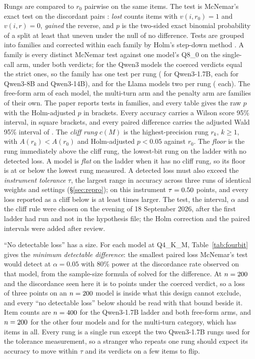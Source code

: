 \documentclass[12pt,letterpaper]{article}
\newcommand{\qm}{Qwen3-1.7B}
\begin{document}
Rungs are compared to $r_0$ pairwise on the same items. The test is McNemar's exact test on the discordant pairs \citep{mcnemar1947}: \emph{lost} counts items with $v(i, r_0)=1$ and $v(i, r)=0$, \emph{gained} the reverse, and $p$ is the two-sided exact binomial probability of a split at least that uneven under the null of no difference. Tests are grouped into families and corrected within each family by Holm's step-down method \citep{holm1979}. A family is every distinct McNemar test against one model's Q8\_0 on the single-call arm, under both verdicts; for the Qwen3 models the coerced verdicts equal the strict ones, so the family has one test per rung (\qtTests{} for \qm{}, \qtTestsEightB{} each for Qwen3-8B and Qwen3-14B), and for the Llama models two per rung (\qtTestsLlamaThreeB{} each). The free-form arm of each model, the multi-turn arm and the penalty arm are families of their own. The paper reports \qtTestsTotal{} tests in \qtFamiliesTotal{} families, and every table gives the raw $p$ with the Holm-adjusted $p$ in brackets. Every accuracy carries a Wilson score 95\% interval, in square brackets, and every paired difference carries the adjusted Wald 95\% interval of \citet{agresti2005paired}. The \emph{cliff rung} $c(M)$ is the highest-precision rung $r_k$, $k \ge 1$, with $A(r_k) < A(r_0)$ and Holm-adjusted $p < 0.05$ against $r_0$. The \emph{floor} is the rung immediately above the cliff rung, the lowest-bit rung on the ladder with no detected loss. A model is \emph{flat} on the ladder when it has no cliff rung, so its floor is at or below the lowest rung measured. A detected loss must also exceed the \emph{instrument tolerance} $\tau$, the largest range in accuracy across three runs of identical weights and settings (\S\ref{sec:repro}); on this instrument $\tau = 0.50{}$ points, and every loss reported as a cliff below is at least \qtCliffOverNoise{} times larger. The test, the interval, $\alpha$ and the cliff rule were chosen on the evening of 18 September 2026, after the first ladder had run and not in the hypothesis file; the Holm correction and the paired intervals were added after review.

``No detectable loss'' has a size. For each model at Q4\_K\_M, Table~\ref{tab:fourbit} gives the \emph{minimum detectable difference}: the smallest paired loss McNemar's test would detect at $\alpha=0.05$ with 80\% power at the discordance rate observed on that model, from the sample-size formula of \citet{connor1987paired} solved for the difference. At $n=200{}$ and the discordance seen here it is \qtFourBitMdeMin{} to \qtFourBitMdeMax{} points under the coerced verdict, so a loss of three points on an $n=200{}$ model is inside what this design cannot exclude, and every ``no detectable loss'' below should be read with that bound beside it. Item counts are $n=400{}$ for the \qm{} ladder and both free-form arms, and $n=200{}$ for the other four models and for the multi-turn category, which has \qtMtN{} items in all. Every rung is a single run except the two \qm{} rungs used for the tolerance measurement, so a stranger who repeats one rung should expect its accuracy to move within $\tau$ and its verdicts on a few items to flip.
\end{document}
